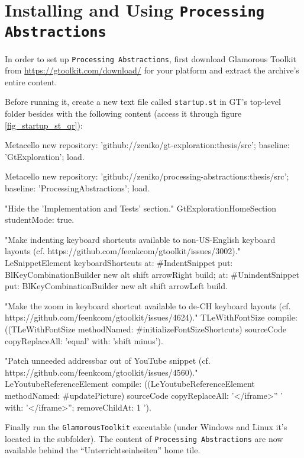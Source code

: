 
\chapter{Installing and Using \texttt{Processing Abstractions}} \label{app_setup}

In order to set up \texttt{Processing Abstractions}, first download Glamorous Toolkit from \url{https://gtoolkit.com/download/} for your platform and extract the archive's entire content.

Before running it, create a new text file called \texttt{startup.st} in GT's top-level folder besides  with the following content (access it through figure \ref{fig_startup_st_qr}):

\begin{code}
Metacello new
	repository: 'github://zeniko/gt-exploration:thesis/src';
	baseline: 'GtExploration';
	load.

Metacello new
	repository: 'github://zeniko/processing-abstractions:thesis/src';
	baseline: 'ProcessingAbstractions';
	load.

"Hide the 'Implementation and Tests' section."
GtExplorationHomeSection studentMode: true.

"Make indenting keyboard shortcuts available to non-US-English keyboard layouts
(cf. https://github.com/feenkcom/gtoolkit/issues/3002)."
LeSnippetElement keyboardShortcuts
	at: #IndentSnippet
		put: BlKeyCombinationBuilder new alt shift arrowRight build;
	at: #UnindentSnippet
		put: BlKeyCombinationBuilder new alt shift arrowLeft build.

"Make the zoom in keyboard shortcut available to de-CH keyboard layouts
(cf. https://github.com/feenkcom/gtoolkit/issues/4624)."
TLeWithFontSize compile:
	((TLeWithFontSize methodNamed: #initializeFontSizeShortcuts) sourceCode
		copyReplaceAll: 'equal' with: 'shift minus').

"Patch unneeded addressbar out of YouTube snippet
(cf. https://github.com/feenkcom/gtoolkit/issues/4560)."
LeYoutubeReferenceElement compile:
	((LeYoutubeReferenceElement methodNamed: #updatePicture) sourceCode
		copyReplaceAll: '</iframe>'' ' with: '</iframe>''; removeChildAt: 1 ').
\end{code}

Finally run the \texttt{GlamorousToolkit} executable (under Windows and Linux it's located in the  subfolder). The content of \texttt{Processing Abstractions} are now available behind the ``Unterrichtseinheiten'' home tile.

